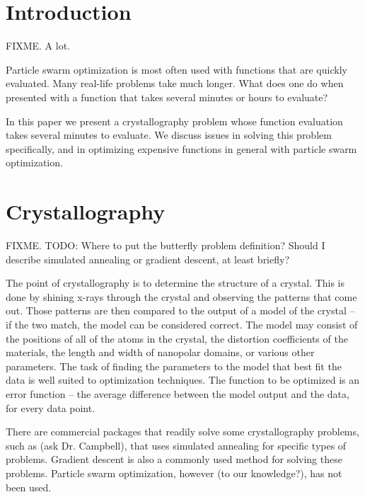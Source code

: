 \documentclass[letterpaper]{sig-alternate}
\begin{document}



\section{Introduction}
\label{sec:intro}

FIXME.  A lot.

Particle swarm optimization is most often used with functions that are quickly
evaluated.  Many real-life problems take much longer.  What does one do when 
presented with a function that takes several minutes or hours to evaluate?  

In this paper we present a crystallography problem whose function evaluation
takes several minutes to evaluate.  We discuss issues in solving this problem
specifically, and in optimizing expensive functions in general with particle 
swarm optimization.


\section{Crystallography}
\label{sec:crystallography}

FIXME.
TODO: Where to put the butterfly problem definition? Should I describe 
simulated annealing or gradient descent, at least briefly?

The point of crystallography is to determine the structure of a crystal.  This
is done by shining x-rays through the crystal and observing the patterns that
come out.  Those patterns are then compared to the output of a model of the 
crystal -- if the two match, the model can be considered correct.  The model
may consist of the positions of all of the atoms in the crystal, the 
distortion coefficients of the materials, the length and width of nanopolar
domains, or various other parameters.  The task of finding the parameters to 
the model that best fit the data is well suited to optimization techniques.  
The function to be optimized is an error function -- the average difference
between the model output and the data, for every data point.

There are commercial packages that readily solve some crystallography problems,
such as (ask Dr. Campbell), that uses simulated annealing for specific types 
of problems.  Gradient descent is also a commonly used method for solving these
problems.  Particle swarm optimization, however (to our knowledge?), has not 
been used.  
\end{document}
